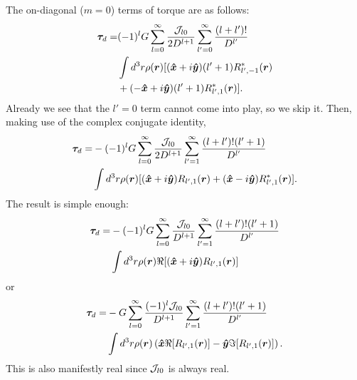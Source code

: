 \documentclass[aps,twocolumn,secnumarabic,balancelastpage,amsmath,amssymb,nofootinbib,floatfix]{revtex4-1}
\begin{document}
The on-diagonal ($m=0$) terms of torque are as follows:
\begin{equation*}
\begin{aligned}
\bm \tau_d = &(-1)^l G\sum_{l=0}^\infty  \frac{\mathcal{J}_{l0}}{2D^{l+1}}\sum_{l'=0}^\infty \frac{(l+l')!}{D^{l'}}\\
& \int d^3 r\rho(\bm r)[(\bm{\hat x} + i\bm{\hat y})(l'+1)R^*_{l',-1}(\bm r)\\
&+(-\bm{\hat x}+i\bm{\hat y})(l'+1)R^*_{l',1}(\bm r)].
\end{aligned}
\end{equation*}
Already we see that the $l'=0$ term cannot come into play, so we skip it. Then, making use of the complex conjugate identity,
\begin{equation*}
\begin{aligned}
\bm \tau_d = &-(-1)^l G\sum_{l=0}^\infty  \frac{\mathcal{J}_{l0}}{2D^{l+1}}\sum_{l'=1}^\infty \frac{(l+l')!(l'+1)}{D^{l'}}\\
& \int d^3 r\rho(\bm r)[(\bm{\hat x} + i\bm{\hat y})R_{l',1}(\bm r)+(\bm{\hat x}-i\bm{\hat y})R^*_{l',1}(\bm r)].
\end{aligned}
\end{equation*}
The result is simple enough:
\begin{equation*}
\begin{aligned}
\bm \tau_d = &-(-1)^l G\sum_{l=0}^\infty  \frac{\mathcal{J}_{l0}}{D^{l+1}}\sum_{l'=1}^\infty \frac{(l+l')!(l'+1)}{D^{l'}}\\
& \int d^3 r\rho(\bm r)\Re[(\bm{\hat x} + i\bm{\hat y})R_{l',1}(\bm r)]
\end{aligned}
\end{equation*}
or
\begin{equation*}
\begin{aligned}
\bm \tau_d = &-G\sum_{l=0}^\infty  \frac{(-1)^l \mathcal{J}_{l0}}{D^{l+1}}\sum_{l'=1}^\infty \frac{(l+l')!(l'+1)}{D^{l'}}\\
& \int d^3 r\rho(\bm r)\left( \bm{\hat x}\Re [R_{l',1}(\bm r)] - \bm{\hat y}\Im [R_{l',1}(\bm r)] \right).
\end{aligned}
\end{equation*}
This is also manifestly real since $\mathcal{J}_{l0}$ is always real.
\end{document}
